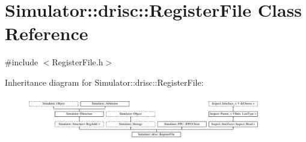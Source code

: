\hypertarget{class_simulator_1_1drisc_1_1_register_file}{\section{Simulator\+:\+:drisc\+:\+:Register\+File Class Reference}
\label{class_simulator_1_1drisc_1_1_register_file}
}


{\ttfamily \#include $<$Register\+File.\+h$>$}

Inheritance diagram for Simulator\+:\+:drisc\+:\+:Register\+File\+:\begin{figure}[H]
\begin{center}
\leavevmode
\includegraphics[height=1.973568cm]{class_simulator_1_1drisc_1_1_register_file}
\end{center}
\end{figure}
